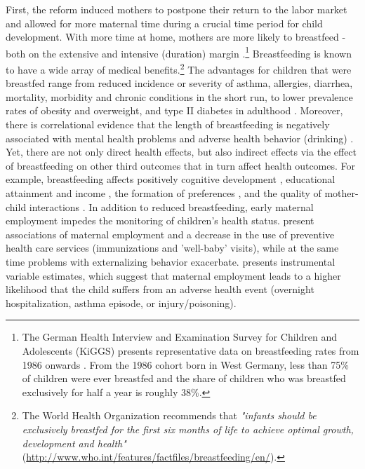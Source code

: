 \documentclass[11pt, a4paper]{article} %
\begin{document}
First, the reform induced mothers to postpone their return to the labor market and allowed for more maternal time during a crucial time period for child development. With more time at home, mothers are more likely to breastfeed - both on the extensive and intensive (duration) margin \citep{baker2008maternal,berger2005earlymaternal}.\footnote{The German Health Interview and Examination Survey for Children and Adolescents (KiGGS) presents representative data on breastfeeding rates from 1986 onwards \citep{lange2007breastfeeding}. From the 1986 cohort born in West Germany, less than 75\% of children were ever breastfed and the share of children who was breastfed exclusively for half a year is roughly 38\%.} Breastfeeding is known to have a wide array of medical benefits.\footnote{The World Health Organization recommends that \textit{"infants should be exclusively breastfed for the first six months of life to achieve optimal growth, development and health"} (\href{http://www.who.int/features/factfiles/breastfeeding/en/}{http://www.who.int/features/factfiles/breastfeeding/en/}).} The advantages for children that were breastfed range from reduced incidence or severity of asthma, allergies, diarrhea, mortality, morbidity and chronic conditions in the short run, to lower prevalence rates of obesity and overweight, and type II diabetes in adulthood \citep{ruhm2000parental, victora2016breastfeeding}. Moreover, there is correlational evidence that the length of breastfeeding is negatively associated with mental health problems and adverse health behavior (drinking) \citep{oddy2010longterm,falk2016early}. Yet, there are not only direct health effects, but also indirect effects via the effect of breastfeeding on other third outcomes that in turn affect health outcomes. For example, breastfeeding affects positively cognitive development \citep{albagli2018}, educational attainment and income \citep{victoria2015association}, the formation of preferences \citep{falk2016early}, and the quality of mother-child interactions \citep{papp2014longitudinal}. \newline 
In addition to reduced breastfeeding, early maternal employment impedes the monitoring of children's health status. \cite{berger2005earlymaternal} present associations of maternal employment and a decrease in the use of preventive health care services (immunizations and 'well-baby' visits), while at the same time problems with externalizing behavior exacerbate. \cite{morrill2011} presents instrumental variable estimates, which suggest that maternal employment leads to a higher likelihood that the child suffers from an adverse health event (overnight hospitalization, asthma episode, or injury/poisoning).\newline 
\end{document}
